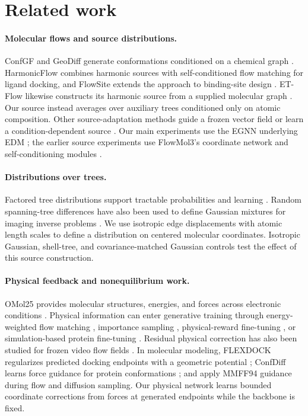 \documentclass{article}
\begin{document}
\section{Related work}
\paragraph{Molecular flows and source distributions.}
ConfGF and GeoDiff generate conformations conditioned on a chemical graph \citep{shi2021confgf,xu2022geodiff}. HarmonicFlow combines harmonic sources with self-conditioned flow matching for ligand docking, and FlowSite extends the approach to binding-site design \citep{stark2024harmonicflow}. ET-Flow likewise constructs its harmonic source from a supplied molecular graph \citep{etflow}. Our source instead averages over auxiliary trees conditioned only on atomic composition. Other source-adaptation methods guide a frozen vector field \citep{wang2026sourceguided} or learn a condition-dependent source \citep{kim2026bettersource}. Our main experiments use the EGNN underlying EDM \citep{edm}; the earlier source experiments use FlowMol3's coordinate network and self-conditioning modules \citep{flowmol3}.

\paragraph{Distributions over trees.}
Factored tree distributions support tractable probabilities and learning \citep{meila2000trees,duan2023spanning}. Random spanning-tree differences have also been used to define Gaussian mixtures for imaging inverse problems \citep{everink2026random}. We use isotropic edge displacements with atomic length scales to define a distribution on centered molecular coordinates. Isotropic Gaussian, shell-tree, and covariance-matched Gaussian controls test the effect of this source construction.

\paragraph{Physical feedback and nonequilibrium work.}
OMol25 provides molecular structures, energies, and forces across electronic conditions \citep{omol25}. Physical information can enter generative training through energy-weighted flow matching \citep{dern2025energyweighted}, importance sampling \citep{fab}, physical-reward fine-tuning \citep{zhou2025rlpf}, or simulation-based protein fine-tuning \citep{lu2024fusing}. Residual physical correction has also been studied for frozen video flow fields \citep{wang2026pila}. In molecular modeling, FLEXDOCK regularizes predicted docking endpoints with a geometric potential \citep{corso2025flexdock}; ConfDiff learns force guidance for protein conformations \citep{wang2024confdiff}; and \citet{lai2026forceguidance} apply MMFF94 guidance during flow and diffusion sampling. Our physical network learns bounded coordinate corrections from forces at generated endpoints while the backbone is fixed.
\end{document}
